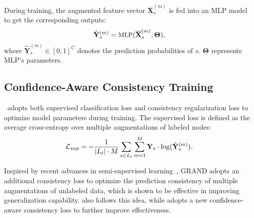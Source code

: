  During training, the augmented feature vector $\overline{\mathbf{X}}^{(m)}_s$ is fed into an MLP model to get the corresponding outputs:
\begin{equation}
\small
\hat{\mathbf{Y}}^{(m)}_s = \text{MLP}(\overline{\mathbf{X}}^{(m)}_s, \mathbf{\Theta}),
\end{equation}
where $\hat{\mathbf{Y}}^{(m)}_s\in [0,1]^C$ denotes the prediction probabilities of $s$. $\mathbf{\Theta}$ represents MLP's parameters. 












\subsection{Confidence-Aware Consistency Training}
\model\ adopts both supervised classification loss and consistency regularization loss to optimize model parameters during training. The supervised loss is defined as the average cross-entropy over multiple augmentations of labeled nodes:
\begin{equation}
\small
\label{equ:suploss}
\mathcal{L}_{sup} = -\frac{1}{|L_t|\cdot M}\sum_{s \in L_t}\sum_{m=1}^{M}\mathbf{Y}_s \cdot \log(\hat{\mathbf{Y}}^{(m)}_s).
\end{equation}

Inspired by recent advances in semi-supervised learning~\cite{berthelot2019mixmatch}, GRAND adopts an additional consistency loss to optimize the prediction consistency of multiple augmentations of unlabeled data, which is shown to be effective in improving generalization capability. \model also follows this idea, while adopts a new confidence-aware consistency loss to further improve effectiveness. 

